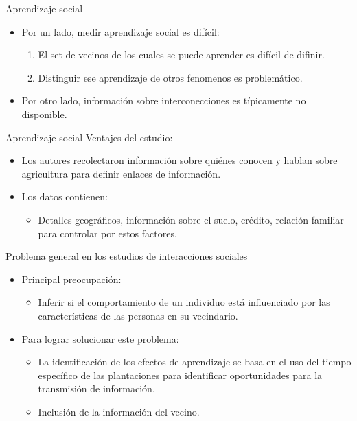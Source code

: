 \documentclass[11pt, aspectratio=169, compress]{beamer}
\begin{document}
\begin{frame}{Aprendizaje social}
	\begin{itemize}
		\item Por un lado, medir aprendizaje social es difícil: 
		\begin{enumerate}
			\item El set de vecinos de los cuales se puede aprender es difícil de difinir. 
			\item Distinguir ese aprendizaje de otros fenomenos es problemático. 
		\end{enumerate}
		\item Por otro lado, información sobre interconecciones es típicamente no disponible. 
	\end{itemize}	
\end{frame}
\begin{frame}{Aprendizaje social}
	Ventajes del estudio: 
	\begin{itemize}
		\item Los autores recolectaron información sobre quiénes conocen y hablan sobre agricultura para definir enlaces de información. 
		\item Los datos contienen: 
		\begin{itemize}
			\item Detalles geográficos, información sobre el suelo, crédito, relación familiar para controlar por estos factores. 
		\end{itemize}
	\end{itemize}
\end{frame}
\begin{frame}{Problema general en los estudios de interacciones sociales}
\begin{itemize}
	\item Principal preocupación: 
	\begin{itemize}
		\item Inferir si el comportamiento de un individuo está influenciado por las características de las personas en su vecindario. 
	\end{itemize}
	\item Para lograr solucionar este problema: 
	\begin{itemize}
		\item La identificación de los efectos de aprendizaje se basa en el uso del tiempo específico de las plantaciones para identificar oportunidades para la transmisión de información. 
		\item Inclusión de la información del vecino. 
	\end{itemize}
\end{itemize}
\end{frame}
\end{document}
